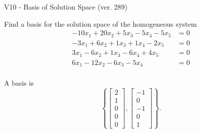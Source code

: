 \begin{exercise}
  \begin{exerciseTitle}V10 - Basis of Solution Space (ver. 289)\end{exerciseTitle}
  \begin{exerciseStatement}
    Find a basis for the solution space of the homogeneous system 
\begin{align*}
 -10 x_ 1 + 20 x_ 2 + 5 x_ 3 -5 x_ 4 -5 x_ 5 &= 0  \\ 
  -3 x_ 1 + 6 x_ 2 + 1 x_ 3 + 1 x_ 4 -2 x_ 5 &= 0  \\ 
  3 x_ 1 -6 x_ 2 + 1 x_ 3 -6 x_ 4 + 4 x_ 5 &= 0  \\ 
  6 x_ 1 -12 x_ 2 -6 x_ 3 -5 x_ 4 &= 0  \\ 
 \end{align*}


 
  \end{exerciseStatement}

  \begin{exerciseAnswer}
   A basis is   
\[\left\{\left[\begin{array}{c}
2 \\
1 \\
0 \\
0 \\
0
\end{array}\right] , \left[\begin{array}{c}
-1 \\
0 \\
-1 \\
0 \\
1
\end{array}\right]\right\}.\]

  


  \end{exerciseAnswer}
\end{exercise}